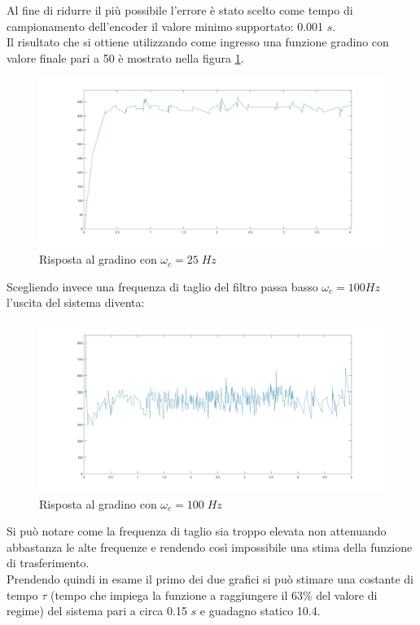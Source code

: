 Al fine di ridurre il più possibile l'errore è stato scelto come tempo di campionamento dell'encoder il valore minimo supportato: 0.001 $s$.\\
Il risultato che si ottiene utilizzando come ingresso una funzione gradino con valore finale pari a 50 è mostrato nella figura \ref{motore50StepCamp1000}.
\begin{figure}[ht]
	\centering
	\includegraphics[width=\textwidth]{motore50StepCamp1000.jpg}
	\caption{Risposta al gradino con $\omega_c=25\;Hz$}
	\label{motore50StepCamp1000}
\end{figure}
Scegliendo invece una frequenza di taglio del filtro passa basso $\omega_c = 100Hz$ l'uscita del sistema diventa:
\begin{figure}[ht]
	\centering
	\includegraphics[width=\textwidth]{motore50StepCamp1000Polo100.jpg}
	\caption{Risposta al gradino con $\omega_c=100\;Hz$ }
	\label{motore50StepCamp1000Polo100}
\end{figure}
Si può notare come la frequenza di taglio sia troppo elevata non attenuando abbastanza le alte frequenze e rendendo così impossibile una stima della funzione di trasferimento.\\
Prendendo quindi in esame il primo dei due grafici si può stimare una costante di tempo $\tau$ (tempo che impiega la funzione a raggiungere il 63\% del valore di regime) del sistema pari a circa 0.15 $s$ e guadagno statico 10.4.\\
